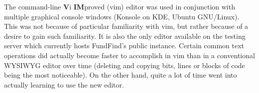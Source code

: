 The command-line \textbf{V}i \textbf{IM}proved (vim) editor was used in conjunction with multiple graphical console windows (Konsole on KDE, Ubuntu GNU/Linux). This was not because of particular familiarity with vim, but rather because of a desire to gain such familiarity. It is also the only editor available on the testing server which currently hosts FundFind's public instance. Certain common text operations did actually become faster to accomplish in vim than in a conventional WYSIWYG editor over time (deleting and copying bits, lines or blocks of code being the most noticeable). On the other hand, quite a lot of time went into actually learning to use the new editor.